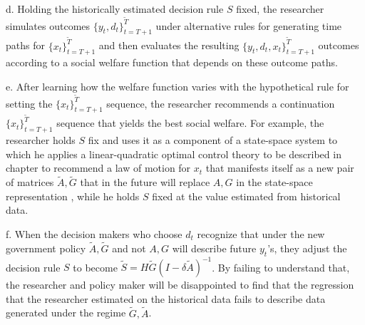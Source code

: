\medskip

\item{d.} Holding the historically estimated decision rule $S $ fixed,
 the researcher simulates outcomes $\{y_t, d_t\}_{t=T+1}^{\tilde T}$
under alternative rules for generating
 time paths  for
 $\{x_t\}_{t=T+1}^{\tilde T}$ and then evaluates the
resulting $\{y_t, d_t, x_t\}_{t=T+1}^{\tilde T}$
outcomes according to a social  welfare function that depends on these outcome paths.   %


\medskip

\item{e.} After
learning how the  welfare function varies with the hypothetical rule for setting the $\{x_t\}_{t=T+1}^{\tilde T}$ sequence,
the researcher recommends  a continuation $\{x_t\}_{t=T+1}^{\tilde T}$
sequence that yields the best social welfare. For example, the researcher holds $S$ fix and uses it as a component
of a state-space system to which he applies a linear-quadratic optimal control theory to be described in chapter  to  recommend a
law of motion for $x_t$ that manifests itself as a new pair of matrices $\tilde A, \tilde G$  that in the future
will replace $A, G$ in the state-space representation , while he holds $S$ fixed at the value estimated from historical data.

\medskip

\item{f.} When  the  decision makers who choose $d_t$ recognize that under the new government policy  $\tilde A, \tilde G$ and not $A, G$ will describe future $y_t$'s, they adjust the decision rule $S$  to become 
 $\tilde S = H \tilde G (I - \delta \tilde A)^{-1}$. By failing to understand that,
the researcher and policy maker will be disappointed to find that the regression  that the researcher  estimated on the historical data  fails to  describe data generated
under the regime $\tilde G, \tilde A$.

\medskip

